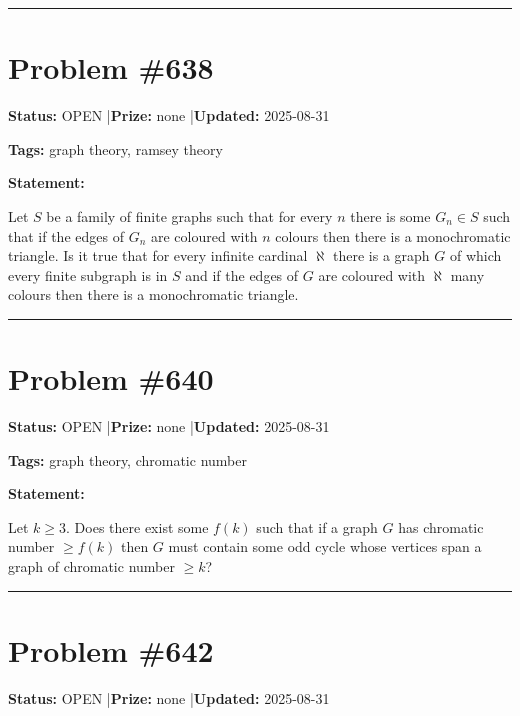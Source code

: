 \documentclass{article}
\begin{document}
\noindent\rule{\linewidth}{0.4pt}


\section{Problem \#638}
\label{prob:638}

\noindent\textbf{Status:} OPEN \quad|\quad \textbf{Prize:} none \quad|\quad \textbf{Updated:} 2025-08-31

\noindent\textbf{Tags:} graph theory, ramsey theory

\medskip

\noindent\textbf{Statement:}

Let $S$ be a family of finite graphs such that for every $n$ there is some $G_n\in S$ such that if the edges of $G_n$ are coloured with $n$ colours then there is a monochromatic triangle. Is it true that for every infinite cardinal $\aleph$ there is a graph $G$ of which every finite subgraph is in $S$ and if the edges of $G$ are coloured with $\aleph$ many colours then there is a monochromatic triangle.

\noindent\rule{\linewidth}{0.4pt}


\section{Problem \#640}
\label{prob:640}

\noindent\textbf{Status:} OPEN \quad|\quad \textbf{Prize:} none \quad|\quad \textbf{Updated:} 2025-08-31

\noindent\textbf{Tags:} graph theory, chromatic number

\medskip

\noindent\textbf{Statement:}

Let $k\geq 3$. Does there exist some $f(k)$ such that if a graph $G$ has chromatic number $\geq f(k)$ then $G$ must contain some odd cycle whose vertices span a graph of chromatic number $\geq k$?

\noindent\rule{\linewidth}{0.4pt}


\section{Problem \#642}
\label{prob:642}

\noindent\textbf{Status:} OPEN \quad|\quad \textbf{Prize:} none \quad|\quad \textbf{Updated:} 2025-08-31
\end{document}
